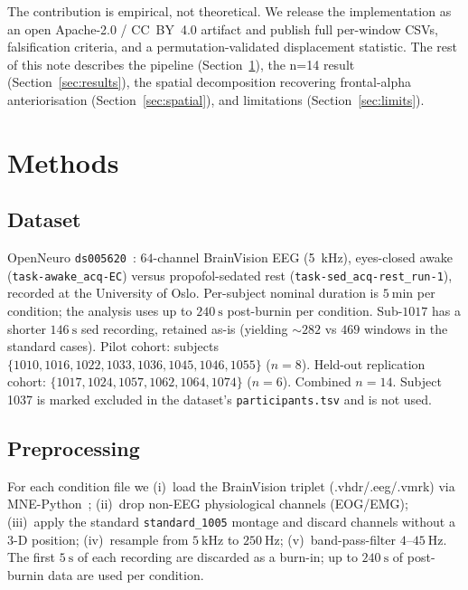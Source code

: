 \documentclass[11pt,a4paper]{article}
\begin{document}
The contribution is empirical, not theoretical. We release the implementation as an open Apache-2.0 / CC~BY~4.0 artifact and publish full per-window CSVs, falsification criteria, and a permutation-validated displacement statistic. The rest of this note describes the pipeline (Section~\ref{sec:methods}), the n=14 result (Section~\ref{sec:results}), the spatial decomposition recovering frontal-alpha anteriorisation (Section~\ref{sec:spatial}), and limitations (Section~\ref{sec:limits}).

\section{Methods}\label{sec:methods}

\subsection{Dataset}

OpenNeuro \texttt{ds005620}~\cite{bajwa2024dataset}: $\num{64}$-channel BrainVision EEG (\SI{5}{\kilo\hertz}), eyes-closed awake (\texttt{task-awake\_acq-EC}) versus propofol-sedated rest (\texttt{task-sed\_acq-rest\_run-1}), recorded at the University of Oslo. Per-subject nominal duration is $\SI{5}{\minute}$ per condition; the analysis uses up to $\SI{240}{\second}$ post-burnin per condition. Sub-$1017$ has a shorter $\SI{146}{\second}$ sed recording, retained as-is (yielding $\sim\!282$ vs $469$ windows in the standard cases). Pilot cohort: subjects $\{1010,1016,1022,1033,1036,1045,1046,1055\}$ ($n=8$). Held-out replication cohort: $\{1017,1024,1057,1062,1064,1074\}$ ($n=6$). Combined $n=14$. Subject \num{1037} is marked excluded in the dataset's \texttt{participants.tsv} and is not used.

\subsection{Preprocessing}

For each condition file we (i)~load the BrainVision triplet (.vhdr/.eeg/.vmrk) via MNE-Python~\cite{gramfort2014mne}; (ii)~drop non-EEG physiological channels (EOG/EMG); (iii)~apply the standard \texttt{standard\_1005} montage and discard channels without a $3$-D position; (iv)~resample from $\SI{5}{\kilo\hertz}$ to $\SI{250}{\hertz}$; (v)~band-pass-filter $\num{4}$--$\SI{45}{\hertz}$. The first $\SI{5}{\second}$ of each recording are discarded as a burn-in; up to $\SI{240}{\second}$ of post-burnin data are used per condition.
\end{document}

